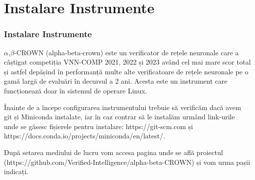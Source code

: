 \documentclass{beamer}
\begin{document}
\section{Instalare Instrumente}
\begin{frame}
  \frametitle{Instalare Instrumente}
{\( \alpha \),\( \beta \)-CROWN (alpha-beta-crown)} este un verificator de rețele neuronale care a câștigat competiția VNN-COMP 2021, 2022 și 2023
având cel mai mare scor total și astfel depășind în performanță multe alte verificatoare de rețele neuronale pe o gamă largă de evaluări în decursul a 2 ani. \cite{alpha-beta-crown}
Acesta este un instrument care funcționează doar în sistemul de operare Linux. 

Înainte de a începe configurarea instrumentului trebuie să verificăm dacă avem git și Miniconda instalate, iar în caz contrar să le instalăm urmând link-urile unde se găsesc fișierele pentru instalare: https://git-scm.com și https://docs.conda.io/projects/miniconda/en/latest/.

\item După setarea mediului de lucru vom accesa pagina unde se află proiectul (https://github.com/Verified-Intelligence/alpha-beta-CROWN) și vom urma pașii indicați.

\end{frame}
\end{document}
